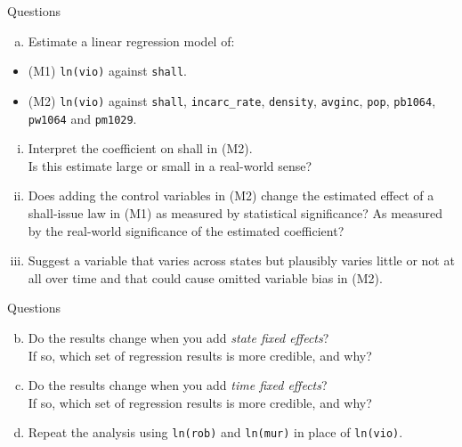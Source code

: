 \documentclass[
  10pt,
  ignorenonframetext,
]{beamer}
\providecommand{\tightlist}{%
  \setlength{\itemsep}{0pt}\setlength{\parskip}{0pt}}
\begin{document}
\begin{frame}[fragile]{Questions}
\protect\hypertarget{questions}{}
\begin{enumerate}
[(a)]
\tightlist
\item
  Estimate a linear regression model of:
\end{enumerate}

\begin{itemize}
\item
  (M1) \texttt{ln(vio)} against \texttt{shall}.
\item
  (M2) \texttt{ln(vio)} against \texttt{shall}, \texttt{incarc\_rate},
  \texttt{density}, \texttt{avginc}, \texttt{pop}, \texttt{pb1064},
  \texttt{pw1064} and \texttt{pm1029}.
\end{itemize}

\begin{enumerate}
[i.]
\item
  Interpret the coefficient on shall in (M2).\\
  Is this estimate large or small in a real-world sense?
\item
  Does adding the control variables in (M2) change the estimated effect
  of a shall-issue law in (M1) as measured by statistical significance?
  As measured by the real-world significance of the estimated
  coefficient?
\item
  Suggest a variable that varies across states but plausibly varies
  little or not at all over time and that could cause omitted variable
  bias in (M2).
\end{enumerate}
\end{frame}

\begin{frame}[fragile]{Questions}
\protect\hypertarget{questions-1}{}
\begin{enumerate}
[(a)]
\setcounter{enumi}{1}
\tightlist
\item
  Do the results change when you add \emph{state fixed effects}?\\
  If so, which set of regression results is more credible, and why?
\end{enumerate}

\vspace{3mm}

\begin{enumerate}
[(a)]
\setcounter{enumi}{2}
\tightlist
\item
  Do the results change when you add \emph{time fixed effects}?\\
  If so, which set of regression results is more credible, and why?
\end{enumerate}

\vspace{3mm}

\begin{enumerate}
[(a)]
\setcounter{enumi}{3}
\tightlist
\item
  Repeat the analysis using \texttt{ln(rob)} and \texttt{ln(mur)} in
  place of \texttt{ln(vio)}.
\end{enumerate}
\end{frame}
\end{document}
